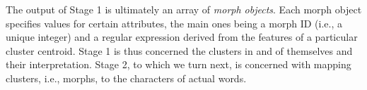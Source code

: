 The output of Stage 1 is ultimately an array of \emph{morph objects}.
 Each morph object specifies values for certain attributes, the main ones 
 being a morph ID (i.e., a unique integer) and a regular expression derived 
 from the features of a particular cluster centroid. Stage 1 is thus
  concerned the clusters in and of themselves and their interpretation. 
  Stage 2, to which we turn next, is concerned with mapping clusters, i.e., 
  morphs, to the characters of actual words. 


